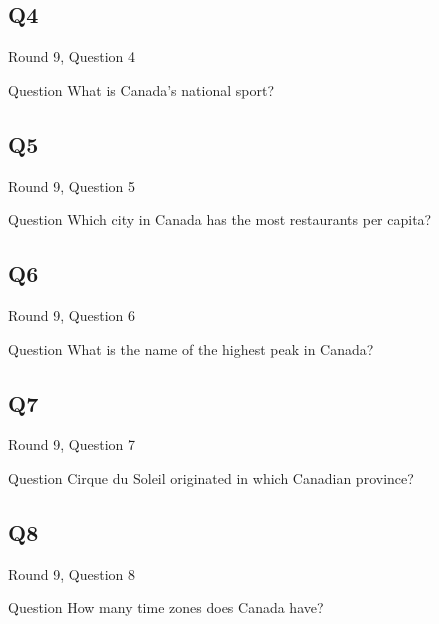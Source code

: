 \documentclass[11pt]{beamer}
\begin{document}
\subsection*{Q4}
\begin{frame}[t]{Round 9, Question 4}
\vspace{0.5em}
\begin{block}{Question}
What is Canada's national sport?
\end{block}
\end{frame}
    

\subsection*{Q5}
\begin{frame}[t]{Round 9, Question 5}
\vspace{0.5em}
\begin{block}{Question}
Which city in Canada has the most restaurants per capita?
\end{block}
\end{frame}
    

\subsection*{Q6}
\begin{frame}[t]{Round 9, Question 6}
\vspace{0.5em}
\begin{block}{Question}
What is the name of the highest peak in Canada?
\end{block}
\end{frame}
    

\subsection*{Q7}
\begin{frame}[t]{Round 9, Question 7}
\vspace{0.5em}
\begin{block}{Question}
Cirque du Soleil originated in which Canadian province?
\end{block}
\end{frame}
    

\subsection*{Q8}
\begin{frame}[t]{Round 9, Question 8}
\vspace{0.5em}
\begin{block}{Question}
How many time zones does Canada have?
\end{block}
\end{frame}
    
\end{document}

